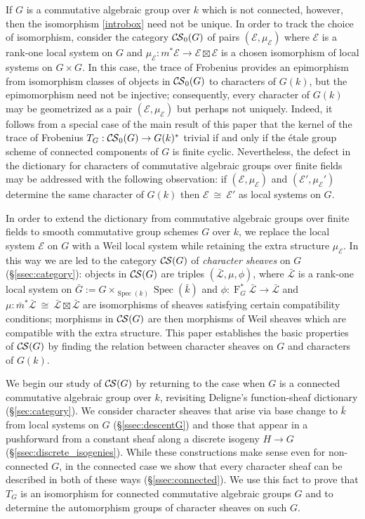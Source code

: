 \documentclass[10pt]{amsart}
\theoremstyle{plain}
\theoremstyle{definition}
\theoremstyle{remark}
\newcommand{\bFq}{\bar{k}}
\newcommand{\Fq}{k}
\newcommand{\Frob}[1]{\operatorname{F}_{#1}}
\newcommand{\Spec}[1]{{\operatorname{Spec}(#1)}}
\newcommand{\iso}{{\ \cong\ }}
\newcommand{\TrFrob}[1]{T_{#1}}
\newcommand{\cs}[1]{{\mathcal{#1}}}
\newcommand{\gcs}[1]{{\mathcal{\bar #1}}}
\newcommand{\CS}{{\mathcal{C\hskip-0.8pt S}}}
\newcommand{\bCS}{{\CS_0}}
\newcommand{\bm}{\bar{m}}
\newcommand{\bG}{\bar{G}}
\begin{document}
If $G$ is a commutative algebraic group over $\Fq$ which is not connected, however, then the isomorphism \eqref{introbox} need not be unique. In order to track the choice of isomorphism, consider the category $\bCS(G)$ of pairs $(\cs{E},\mu_\cs{E})$ where $\cs{E}$ is a rank-one local system on $G$ and $\mu_\cs{E} : m^*\cs{E} \to \cs{E}\boxtimes\cs{E}$ is a chosen isomorphism of local systems on $G\times G$. 
In this case, the trace of Frobenius provides an epimorphism from isomorphism classes of objects in $\bCS(G)$ to characters of $G(\Fq)$, but the epimomorphism need not be injective; consequently,
every character of $G(\Fq)$ may be geometrized as a pair $(\cs{E},\mu_\cs{E})$ but perhaps not uniquely.
Indeed, it follows from a special case of the main result of this paper that the kernel of the trace of Frobenius $T_{G} : \bCS(G) \to G(\Fq)^*$ trivial if and only if the \'etale group scheme of connected components of $G$ is finite cyclic.
Nevertheless, the defect in the dictionary for characters of commutative algebraic groups over finite fields may be addressed with the following observation: if $(\cs{E},\mu_\cs{E})$ and $(\cs{E}',\mu_\cs{E}')$ determine the same character of $G(\Fq)$ then $\cs{E}\iso \cs{E}'$ as local systems on $G$.


In order to extend the dictionary from commutative algebraic groups over finite fields to smooth commutative group schemes $G$ over $\Fq$,
we replace the local system $\cs{E}$ on $G$ with a Weil local system while retaining the extra structure $\mu_\cs{E}$. 
In this way we are led to the category $\CS(G)$ of {\it character sheaves} on $G$ (\S\ref{ssec:category}):
objects in $\CS(G)$ are triples $(\gcs{L}, \mu,\phi)$, where $\gcs{L}$ is a rank-one local system on $\bG := G\times_{\Spec{\Fq}} \Spec{\bFq}$
and $\phi : \Frob{G}^* \gcs{L}\to \gcs{L}$ and $\mu : \bm^* \gcs{L} \iso \gcs{L} \boxtimes \gcs{L}$ are isomorphisms of sheaves satisfying certain compatibility conditions;
morphisms in $\CS(G)$ are then morphisms of Weil sheaves which are compatible with the extra structure.
This paper establishes the basic properties of $\CS(G)$ by finding the relation between character sheaves on $G$ and characters of $G(\Fq)$.

We begin our study of $\CS(G)$ by returning to the case when $G$ is a connected commutative algebraic group over $\Fq$, revisiting Deligne's function-sheaf dictionary (\S\ref{sec:category}).
We consider character sheaves that arise via base change to $\bFq$ from local systems on $G$ (\S\ref{ssec:descentG}) and
those that appear in a pushforward from a constant sheaf along a discrete isogeny $H \to G$ (\S\ref{ssec:discrete_isogenies}).  
While these constructions make sense even for non-connected $G$, in the connected case we show that every character sheaf can be described in both of these ways (\S\ref{ssec:connected}).  
We use this fact to prove that $\TrFrob{G}$ is an isomorphism for connected commutative algebraic groups $G$
and to determine the automorphism groups of character sheaves on such $G$. 
\end{document}
